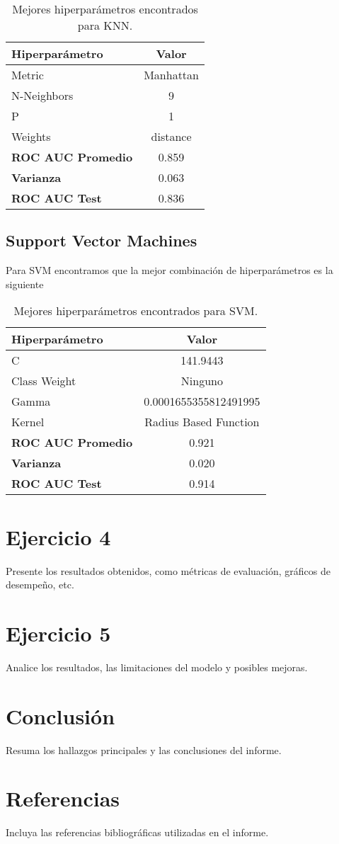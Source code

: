 \documentclass[12pt,a4paper]{article}
\begin{document}
\begin{table}[H]
    \centering
    \begin{tabular}{|l|c|}
    \hline
    \textbf{Hiperparámetro} & \textbf{Valor} \\
    \hline
    Metric & Manhattan \\
    N-Neighbors & 9 \\
    P & 1 \\
    Weights & distance \\
    \hline
    \textbf{ROC AUC Promedio} & 0.859 \\
    \textbf{Varianza} & 0.063 \\
    \textbf{ROC AUC Test} & 0.836 \\
    \hline
    \end{tabular}
    \caption{Mejores hiperparámetros encontrados para KNN.}
    \label{tab:mejores-hiperparametros-knn}
\end{table}

\subsection*{Support Vector Machines}

\par Para SVM encontramos que la mejor combinación de hiperparámetros es la siguiente

\begin{table}[H]
    \centering
    \begin{tabular}{|l|c|}
    \hline
    \textbf{Hiperparámetro} & \textbf{Valor} \\
    \hline
    C & 141.9443 \\
    Class Weight & Ninguno \\
    Gamma & 0.0001655355812491995 \\
    Kernel & Radius Based Function \\
    \hline
    \textbf{ROC AUC Promedio} & 0.921 \\
    \textbf{Varianza} & 0.020 \\
    \textbf{ROC AUC Test} & 0.914 \\
    \hline
    \end{tabular}
    \caption{Mejores hiperparámetros encontrados para SVM.}
    \label{tab:mejores-hiperparametros-svm}
\end{table}


\section{Ejercicio 4}
Presente los resultados obtenidos, como métricas de evaluación, gráficos de desempeño, etc.

\section{Ejercicio 5}
Analice los resultados, las limitaciones del modelo y posibles mejoras.

\section{Conclusión}
Resuma los hallazgos principales y las conclusiones del informe.

\section*{Referencias}
Incluya las referencias bibliográficas utilizadas en el informe.
\end{document}
